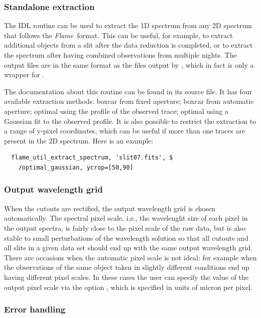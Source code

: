 \documentclass[a4paper]{article}
\newcommand{\flame}{\emph{Flame}}
\begin{document}
\begin{sloppypar}
\subsubsection{Standalone extraction}
\label{sec:util_extract}

The IDL routine  can be used to extract the 1D spectrum from any 2D spectrum that follows the \flame\ format. This can be useful, for example, to extract additional objects from a slit after the data reduction is completed, or to extract the spectrum after having combined observations from multiple nights.
The output files are in the same format as the files output by , which in fact is only a wrapper for .

The documentation about this routine can be found in its source file. It has four available extraction methods: boxcar from fixed aperture; boxcar from automatic aperture; optimal using the profile of the observed trace; optimal using a Gaussian fit to the observed profile. It is also possible to restrict the extraction to a range of y-pixel coordinates, which can be useful if more than one traces are present in the 2D spectrum. Here is an example:
\begin{lstlisting}
  flame_util_extract_spectrum, 'slit07.fits', $
    /optimal_gaussian, ycrop=[50,90]
\end{lstlisting}


\subsubsection{Output wavelength grid}

When the cutouts are rectified, the output wavelength grid is chosen automatically. The spectral pixel scale, i.e., the wavelenght size of each pixel in the output spectra, is fairly close to the pixel scale of the raw data, but is also stable to small perturbations of the wavelength solution so that all cutouts and all slits in a given data set should end up with the same output wavelength grid. There are occasions when the automatic pixel scale is not ideal: for example when the observations of the same object taken in slightly different conditions end up having different pixel scales. In these cases the user can specify the value of the output pixel scale via the option , which is specified in units of micron per pixel.


\subsubsection{Error handling}


\end{sloppypar}
\end{document}
